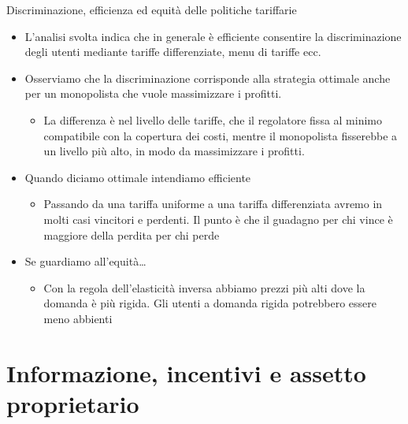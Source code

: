 \documentclass[aspectratio=64,12pt]{beamer}
\begin{document}
\begin{frame}{Discriminazione, efficienza ed equità delle politiche tariffarie}
\begin{itemize}
\item L'analisi svolta indica che in generale è efficiente consentire la
discriminazione degli utenti mediante tariffe differenziate, menu di tariffe
ecc.
\item Osserviamo che la discriminazione corrisponde alla strategia ottimale anche
per un monopolista che vuole massimizzare i profitti.
\begin{itemize}
\item La differenza è nel \alert{livello} delle tariffe, che il regolatore
  fissa al minimo compatibile con la copertura dei costi, mentre il
  monopolista fisserebbe a un livello più alto, in modo da massimizzare i profitti.
\end{itemize}
\item Quando diciamo \alert{ottimale} intendiamo \alert{efficiente}
\begin{itemize}
\item Passando da una tariffa uniforme a una tariffa differenziata avremo in
molti casi vincitori e perdenti. Il punto è che il guadagno per chi vince
è maggiore della perdita per chi perde
\end{itemize}
\item Se guardiamo all'equità\ldots{}
\begin{itemize}
\item Con la regola dell'elasticità inversa abbiamo prezzi più alti dove la domanda è più rigida. Gli utenti a domanda rigida potrebbero essere meno abbienti
\end{itemize}
\end{itemize}
\end{frame}

\section{Informazione, incentivi e assetto proprietario}
\end{document}
